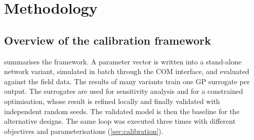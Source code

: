 \documentclass[11pt,a4paper]{article}
\begin{document}
\section{Methodology}
\label{sec:method}

\subsection{Overview of the calibration framework}

 summarises the framework. A parameter vector is written into a stand-alone
network variant, simulated in batch through the COM interface, and evaluated against the field
data. The results of many variants train one GP surrogate per output. The surrogates are used for
sensitivity analysis and for a constrained optimisation, whose result is refined locally and
finally validated with independent random seeds. The validated model is then the baseline for the
alternative designs. The same loop was executed three times with different objectives and
parameterisations (\cref{sec:calibration}).
\end{document}
